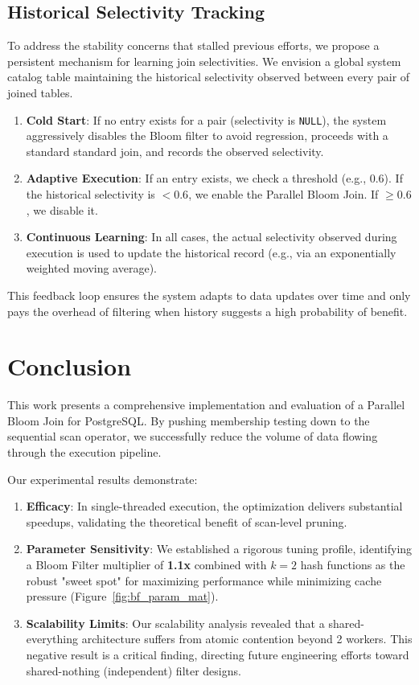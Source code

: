 \documentclass[sigconf,nonacm]{acmart}
\begin{document}
\subsection{Historical Selectivity Tracking}
To address the stability concerns that stalled previous efforts, we propose a persistent mechanism for learning join selectivities. We envision a global system catalog table maintaining the historical selectivity observed between every pair of joined tables.
\begin{enumerate}
    \item \textbf{Cold Start}: If no entry exists for a pair (selectivity is \texttt{NULL}), the system aggressively disables the Bloom filter to avoid regression, proceeds with a standard standard join, and records the observed selectivity.
    \item \textbf{Adaptive Execution}: If an entry exists, we check a threshold (e.g., 0.6). If the historical selectivity is $< 0.6$, we enable the Parallel Bloom Join. If $\ge 0.6$, we disable it.
    \item \textbf{Continuous Learning}: In all cases, the actual selectivity observed during execution is used to update the historical record (e.g., via an exponentially weighted moving average).
\end{enumerate}
This feedback loop ensures the system adapts to data updates over time and only pays the overhead of filtering when history suggests a high probability of benefit.

\section{Conclusion}
This work presents a comprehensive implementation and evaluation of a Parallel Bloom Join for PostgreSQL. By pushing membership testing down to the sequential scan operator, we successfully reduce the volume of data flowing through the execution pipeline.

Our experimental results demonstrate:
\begin{enumerate}
    \item \textbf{Efficacy}: In single-threaded execution, the optimization delivers substantial speedups, validating the theoretical benefit of scan-level pruning.
    \item \textbf{Parameter Sensitivity}: We established a rigorous tuning profile, identifying a Bloom Filter multiplier of \textbf{1.1x} combined with \textbf{$k=2$} hash functions as the robust "sweet spot" for maximizing performance while minimizing cache pressure (Figure~\ref{fig:bf_param_mat}).
    \item \textbf{Scalability Limits}: Our scalability analysis revealed that a shared-everything architecture suffers from atomic contention beyond 2 workers. This negative result is a critical finding, directing future engineering efforts toward shared-nothing (independent) filter designs.
\end{enumerate}
\end{document}
